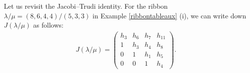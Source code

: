 \documentclass[numbers=enddot,12pt,final,onecolumn,notitlepage]{scrartcl}%
\theoremstyle{definition}
\newtheorem{remk}[theo]{Remark}
\newenvironment{remark}[1][]
{\begin{remk}[#1]\begin{leftbar}}
{\end{leftbar}\end{remk}}
\newtheorem{exam}[theo]{Example}
\newenvironment{example}[1][]
{\begin{exam}[#1]\begin{leftbar}}
{\end{leftbar}\end{exam}}
\theoremstyle{plainsl}
\begin{document}
Let us revisit the Jacobi--Trudi identity. For the ribbon  $\lambda/\mu= (8,6,4,4)/(5,3,3)$ in Example \ref{ribbontableaux} (i), we can write down $J(\lambda/\mu)$ as follows:
\begin{align*}
J(\lambda/\mu)
= %
\begin{pmatrix}
h_3 & h_6 & h_7 & h_{11} \\ 
1 & h_3 & h_4 & h_8 \\
0 & 1 & h_1 & h_5 \\
0 & 0 & 1 & h_4
\end{pmatrix} .
\end{align*}








\end{document}
